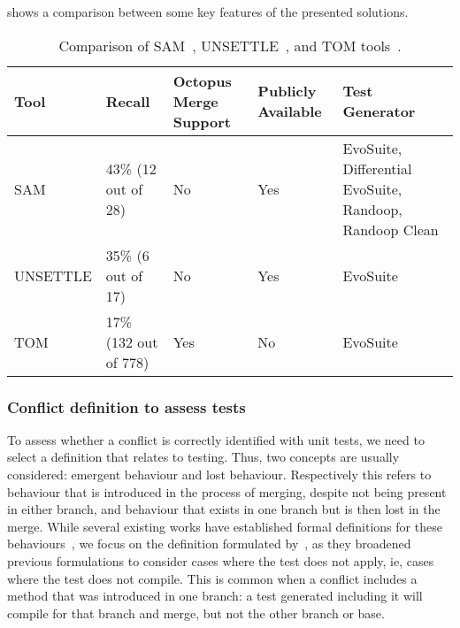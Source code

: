  shows a comparison between some key features of the presented solutions.


\begin{table}[t]
\setlength\extrarowheight{2pt}
\begin{tabularx}{\textwidth}{p{}p{}p{}p{}p{}}
  \toprule
  \textbf{Tool} & \textbf{Recall} & \textbf{Octopus Merge Support} & \textbf{Publicly Available} & \textbf{Test Generator} \\
  \midrule
  SAM & 43\% \newline (12 out of 28) & No & Yes & EvoSuite, Differential EvoSuite, Randoop, Randoop Clean \\ \hline
  UNSETTLE & 35\% \newline (6 out of 17) & No & Yes & EvoSuite \\ \hline
  TOM & 17\% \newline (132 out of 778) & Yes & No & EvoSuite \\
 \bottomrule
\end{tabularx}
\caption{\label{table:tool-comparison}Comparison of SAM~\cite{kn:leuson2}, UNSETTLE~\cite{kn:nuno}, and TOM tools~\cite{kn:ji2022}.}
\end{table}



\subsubsection{Conflict definition to assess tests}\label{chap:rw:behaviours}

To assess whether a conflict is correctly identified with unit tests, we need to select a definition that relates to testing.
Thus, two concepts are usually considered: emergent behaviour and lost behaviour. Respectively this refers to behaviour that 
is introduced in the process of merging, despite not being present in either branch, and behaviour that exists in one branch
but is then lost in the merge. While several existing works have established formal definitions for these behaviours~\cite{kn:taoji,kn},
we focus on the definition formulated by~\citet{kn:nuno}, as they broadened previous formulations to consider cases where the test does not apply,
ie, cases where the test does not compile. This is common when a conflict includes a method that was introduced in one branch: a test generated including
it will compile for that branch and merge, but not the other branch or base.

